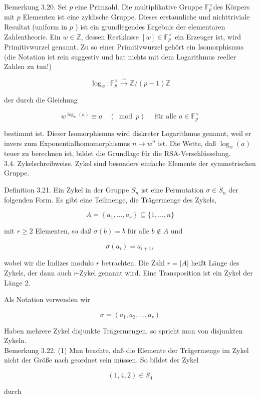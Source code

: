 \documentclass[10pt, letterpaper]{article}
\begin{document}
Bemerkung 3.20. Sei $p$ eine Primzahl. Die multiplikative Gruppe $\mathbb{F}_{p}^{\times}$des Körpers mit $p$ Elementen ist eine zyklische Gruppe. Dieses erstaunliche und nichttriviale Resultat (uniform in $p$ ) ist ein grundlegendes Ergebnis der elementaren Zahlentheorie. Ein $w \in \mathbb{Z}$, dessen Restklasse $[w] \in \mathbb{F}_{p}^{\times}$ ein Erzeuger ist, wird Primitivwurzel genannt. Zu so einer Primitivwurzel gehört ein Isomorphismus (die Notation ist rein suggestiv und hat nichts mit dem Logarithmus reeller Zahlen zu tun!)

$$
\log _{w}: \mathbb{F}_{p}^{\times} \xrightarrow{\sim} \mathbb{Z} /(p-1) \mathbb{Z}
$$

der durch die Gleichung

$$
w^{\log _{w}(a)} \equiv a \quad(\bmod p) \quad \text { für alle } a \in \mathbb{F}_{p}^{\times}
$$

bestimmt ist. Dieser Isomorphismus wird diskreter Logarithmus genannt, weil er invers zum Exponentialhomomorphismus $n \mapsto w^{n}$ ist. Die Wette, daß $\log _{w}(a)$ teuer zu berechnen ist, bildet die Grundlage für die RSA-Verschlüsselung.\\
3.4. Zykelschreibweise. Zykel sind besonders einfache Elemente der symmetrischen Gruppe.

Definition 3.21. Ein Zykel in der Gruppe $S_{n}$ ist eine Permutation $\sigma \in S_{n}$ der folgenden Form. Es gibt eine Teilmenge, die Trägermenge des Zykels,

$$
A=\left\{a_{1}, \ldots, a_{r}\right\} \subseteq\{1, \ldots, n\}
$$

mit $r \geq 2$ Elementen, so daß $\sigma(b)=b$ für alle $b \notin A$ und

$$
\sigma\left(a_{i}\right)=a_{i+1},
$$

wobei wir die Indizes modulo $r$ betrachten. Die Zahl $r=|A|$ heißt Länge des Zykels, der dann auch $r$-Zykel genannt wird. Eine Transposition ist ein Zykel der Länge 2.

Als Notation verwenden wir

$$
\sigma=\left(a_{1}, a_{2}, \ldots, a_{r}\right)
$$

Haben mehrere Zykel disjunkte Trägermengen, so spricht man von disjunkten Zykeln.\\
Bemerkung 3.22. (1) Man beachte, daß die Elemente der Trägermenge im Zykel nicht der Größe nach geordnet sein müssen. So bildet der Zykel

$$
(1,4,2) \in S_{4}
$$

durch
\end{document}
